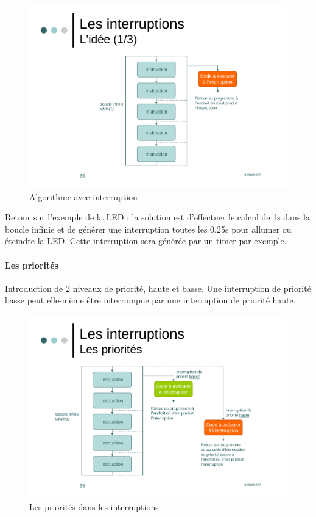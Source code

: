 \documentclass[a4paper]{article}
\begin{document}
\begin{figure}[H]
	\centering
	\includegraphics[scale=0.60]{Images/Interruptions_idee}
	\caption{Algorithme avec interruption
		\label{Interruptions_idee}}
\end{figure}

Retour sur l'exemple de la \ac{LED} : la solution est d'effectuer le calcul de 1s dans la boucle infinie et de générer une interruption toutes les 0,25s pour allumer ou éteindre la \ac{LED}. Cette interruption sera générée par un timer par exemple.

\paragraph{Les priorités}

Introduction de 2 niveaux de priorité, haute et basse. Une interruption de priorité basse peut elle-même être interrompue par une interruption de priorité haute.

\begin{figure}[H]
	\centering
	\includegraphics[scale=0.60]{Images/Interruptions_priorites}
	\caption{Les priorités dans les interruptions
		\label{Interruptions_priorites}}
\end{figure}
\end{document}
